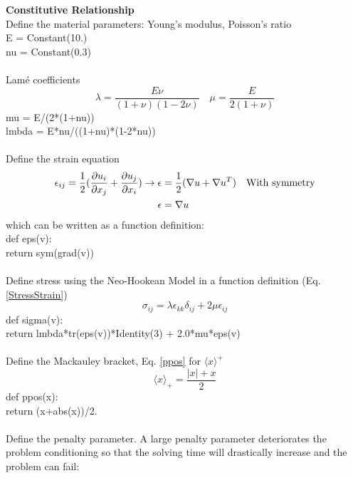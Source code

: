 \documentclass[12pt,3p]{article}
\begin{document}
\textbf{Constitutive Relationship} \\
Define the material parameters: Young's modulus, Poisson's ratio \\
{\selectfont
E = Constant(10.)            \\
nu = Constant(0.3)              \\ \\
}
Lamé coefficients
\begin{equation*}
\lambda = \frac{E \nu}{(1+ \nu) (1 - 2 \nu)} \quad \mu = \frac{E}{2 (1+ \nu)}
\end{equation*}
{\selectfont
mu = E/(2*(1+nu))              \\
lmbda = E*nu/((1+nu)*(1-2*nu))  \\ \\
}
Define the strain equation
\begin{align*}
\epsilon_{ij} = \frac{1}{2} (\pdv{u_i}{x_j} + \pdv{u_j}{x_i}) \rightarrow \epsilon &= \frac{1}{2} (\nabla u + \nabla u^T) \quad \text{With symmetry} \\
 \epsilon &= \nabla u
\end{align*}
which can be written as a function definition: \\
{\selectfont
def eps(v): \\
\indent return sym(grad(v)) \\ \\
}
Define stress using the Neo-Hookean Model in a function definition (Eq. \ref{StressStrain}) 
\begin{equation*}
\sigma_{ij} = \lambda \epsilon_{kk} \delta_{ij} + 2 \mu \epsilon_{ij}
\end{equation*}
{\selectfont
def sigma(v): \\
\indent return lmbda*tr(eps(v))*Identity(3) + 2.0*mu*eps(v) \\ \\
}
Define the Mackauley bracket, Eq. \ref{ppos} for  $\langle x \rangle^+$
\begin{equation*}
\langle x \rangle_{+} = \frac{|x| + x}{2} 
\end{equation*}
{\selectfont
def ppos(x): \\
\indent return (x+abs(x))/2. \\ \\ 
}
Define the penalty parameter. A large penalty parameter deteriorates the problem conditioning so that the solving time will drastically increase and the problem can fail: \\ 
\end{document}
